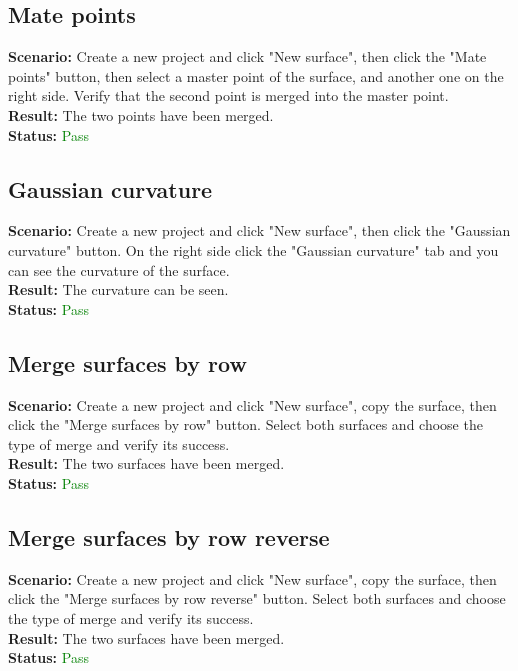 \documentclass[a4paper, 11pt, article]{report}
\begin{document}
\subsection{Mate points}

\noindent \textbf{Scenario:} Create a new project and click "New surface", then click the "Mate points" button, then select a master point of the surface, and another one on the right side. Verify that the second point is merged into the master point.
\\
\noindent \textbf{Result:} The two points have been merged.
\\
\noindent \textbf{Status:} \textcolor{green}{Pass}

\subsection{Gaussian curvature}

\noindent \textbf{Scenario:} Create a new project and click "New surface", then click the "Gaussian curvature" button. On the right side click the "Gaussian curvature" tab and you can see the curvature of the surface.
\\
\noindent \textbf{Result:} The curvature can be seen.
\\
\noindent \textbf{Status:} \textcolor{green}{Pass}

\subsection{Merge surfaces by row}

\noindent \textbf{Scenario:} Create a new project and click "New surface", copy the surface, then click the "Merge surfaces by row" button. Select both surfaces and choose the type of merge and verify its success.
\\
\noindent \textbf{Result:} The two surfaces have been merged.
\\
\noindent \textbf{Status:} \textcolor{green}{Pass}

\subsection{Merge surfaces by row reverse}

\noindent \textbf{Scenario:} Create a new project and click "New surface", copy the surface, then click the "Merge surfaces by row reverse" button. Select both surfaces and choose the type of merge and verify its success.
\\
\noindent \textbf{Result:} The two surfaces have been merged.
\\
\noindent \textbf{Status:} \textcolor{green}{Pass}
\end{document}
